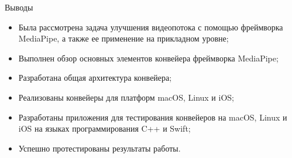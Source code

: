 \documentclass[aspectratio=169,xcolor=dvipsnames]{beamer}
\begin{document}

\begin{frame}{Выводы}
    \begin{itemize}
        \item Была рассмотрена задача улучшения видеопотока с помощью фреймворка MediaPipe, а также ее применение на прикладном уровне;
        \item Выполнен обзор основных элементов конвейера фреймворка MediaPipe;
        \item Разработана общая архитектура конвейера;
        \item Реализованы конвейеры для платформ macOS, Linux и iOS;
        \item Разработаны приложения для тестирования конвейеров на macOS, Linux и iOS на языках программирования C++ и Swift;
        \item Успешно протестированы результаты работы.
    \end{itemize}
\end{frame}

\end{document}
